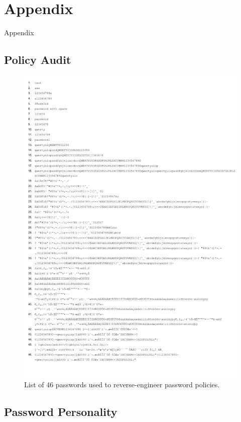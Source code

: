 \chapter[Appendix]{Appendix}
\Huge{Appendix}
\section*{Policy Audit}
\begin{figure}
	\centering
	\includegraphics[width=\linewidth]{content/problem_space/reuse-passwords}
	\caption{\label{fig:appendix:password-list-audit} List of 46 passwords used to reverse-engineer password policies.}
\end{figure}



\section*{Password Personality}


